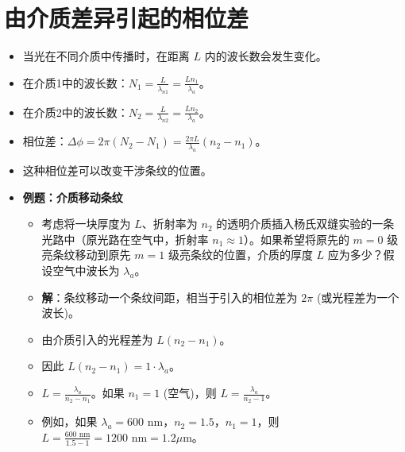 \documentclass[UTF8]{ctexart}
\begin{document}
\section{由介质差异引起的相位差}
\begin{itemize}
    \item 当光在不同介质中传播时，在距离 $L$ 内的波长数会发生变化。
    \item 在介质1中的波长数：$N_1 = \frac{L}{\lambda_{n1}} = \frac{Ln_1}{\lambda_a}$。
    \item 在介质2中的波长数：$N_2 = \frac{L}{\lambda_{n2}} = \frac{Ln_2}{\lambda_a}$。
    \item 相位差：$\Delta\phi = 2\pi (N_2 - N_1) = \frac{2\pi L}{\lambda_a} (n_2 - n_1)$。
    \item 这种相位差可以改变干涉条纹的位置。
    \item \textbf{例题：介质移动条纹}
        \begin{itemize}
            \item 考虑将一块厚度为 $L$、折射率为 $n_2$ 的透明介质插入杨氏双缝实验的一条光路中（原光路在空气中，折射率 $n_1 \approx 1$）。如果希望将原先的 $m=0$ 级亮条纹移动到原先 $m=1$ 级亮条纹的位置，介质的厚度 $L$ 应为多少？假设空气中波长为 $\lambda_a$。
            \item \textbf{解}：条纹移动一个条纹间距，相当于引入的相位差为 $2\pi$ (或光程差为一个波长)。
            \item 由介质引入的光程差为 $L(n_2 - n_1)$。
            \item 因此 $L(n_2 - n_1) = 1 \cdot \lambda_a$。
            \item $L = \frac{\lambda_a}{n_2 - n_1}$。如果 $n_1=1$ (空气)，则 $L = \frac{\lambda_a}{n_2 - 1}$。
            \item 例如，如果 $\lambda_a = 600 \text{ nm}$，$n_2=1.5$，$n_1=1$，则 $L = \frac{600 \text{ nm}}{1.5-1} = 1200 \text{ nm} = 1.2 \mu\text{m}$。
        \end{itemize}
\end{itemize}
\end{document}
